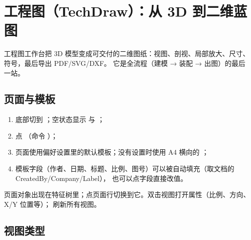\chapter{工程图（TechDraw）：从 3D 到二维蓝图}

工程图工作台把 3D 模型变成可交付的二维图纸：视图、剖视、局部放大、尺寸、符号，最后导出 PDF/SVG/DXF。
它是全流程（建模 → 装配 → 出图）的最后一站。

\section{页面与模板}

\begin{enumerate}
  \item 底部切到 ；空状态显示  与 ；
  \item 点 （命令 ）；
  \item 页面使用偏好设置里的默认模板；没有设置时使用 A4 横向的 ；
  \item 模板字段（作者、日期、标题、比例、图号）可以被自动填充（取文档的 CreatedBy/Company/Label），
        也可以点字段直接改值。
\end{enumerate}

页面对象出现在特征树里；点页面行切换到它。双击视图打开属性（比例、方向、X/Y 位置等）；
 刷新所有视图。

\section{视图类型}

